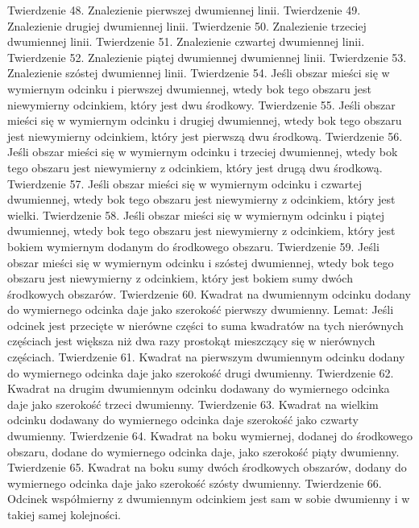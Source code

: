     Twierdzenie 48.
        Znalezienie pierwszej dwumiennej linii.
    Twierdzenie 49.
        Znalezienie drugiej dwumiennej linii.
    Twierdzenie 50.
        Znalezienie trzeciej dwumiennej linii.
    Twierdzenie 51.
        Znalezienie czwartej dwumiennej linii.
    Twierdzenie 52.
        Znalezienie piątej dwumiennej dwumiennej linii.
    Twierdzenie 53.
        Znalezienie szóstej dwumiennej linii.
    Twierdzenie 54.
        Jeśli obszar mieści się w wymiernym odcinku i pierwszej dwumiennej, wtedy bok tego obszaru jest niewymierny odcinkiem, który jest dwu środkowy.
    Twierdzenie 55.
        Jeśli obszar mieści się w wymiernym odcinku i drugiej dwumiennej, wtedy bok tego obszaru jest niewymierny odcinkiem, który jest pierwszą dwu środkową.
    Twierdzenie 56.
        Jeśli obszar mieści się w wymiernym odcinku i trzeciej dwumiennej, wtedy bok tego obszaru jest niewymierny z odcinkiem, który jest drugą dwu środkową.
    Twierdzenie 57.
        Jeśli obszar mieści się w wymiernym odcinku i czwartej dwumiennej, wtedy bok tego obszaru jest niewymierny z odcinkiem, który jest wielki.
    Twierdzenie 58.
        Jeśli obszar mieści się w wymiernym odcinku i piątej dwumiennej, wtedy bok tego obszaru jest niewymierny z odcinkiem, który jest bokiem wymiernym dodanym do środkowego obszaru.
    Twierdzenie 59.
        Jeśli obszar mieści się w wymiernym odcinku i szóstej dwumiennej, wtedy bok tego obszaru jest niewymierny z odcinkiem, który jest bokiem sumy dwóch środkowych obszarów.
    Twierdzenie 60.
        Kwadrat na dwumiennym odcinku dodany do wymiernego odcinka daje jako szerokość pierwszy dwumienny.
        Lemat:
        Jeśli odcinek jest przecięte w nierówne części to suma kwadratów na tych nierównych częściach jest większa niż dwa razy prostokąt mieszczący się w nierównych częściach.
    Twierdzenie 61.
        Kwadrat na pierwszym dwumiennym odcinku dodany do wymiernego odcinka daje jako szerokość drugi dwumienny.
    Twierdzenie 62.
        Kwadrat na drugim dwumiennym odcinku dodawany do wymiernego odcinka daje jako szerokość trzeci dwumienny.
    Twierdzenie 63.
        Kwadrat na wielkim odcinku dodawany do wymiernego odcinka daje szerokość jako czwarty dwumienny.
    Twierdzenie 64.
        Kwadrat na boku wymiernej, dodanej do środkowego obszaru, dodane do wymiernego odcinka daje, jako szerokość piąty dwumienny.
    Twierdzenie 65.
        Kwadrat na boku sumy dwóch środkowych obszarów, dodany do wymiernego odcinka daje jako szerokość szósty dwumienny.
    Twierdzenie 66.
        Odcinek współmierny z dwumiennym odcinkiem jest sam w sobie dwumienny i w takiej samej kolejności.
